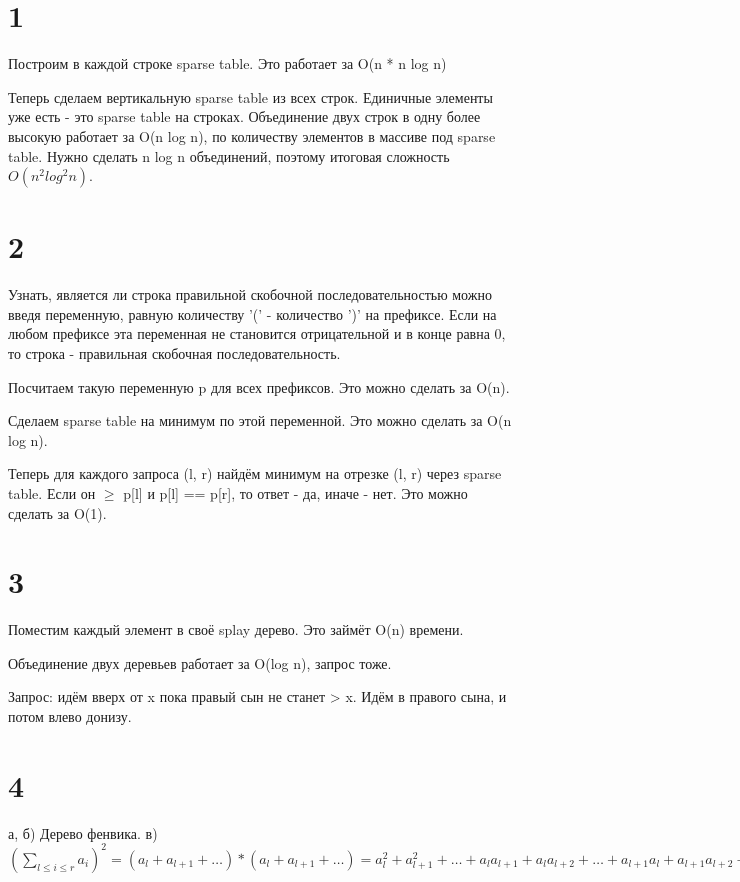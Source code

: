 \documentclass[12pt]{extarticle}
\begin{document}
\section*{1}
Построим в каждой строке sparse table. Это работает за O(n * n log n)

Теперь сделаем вертикальную sparse table из всех строк. Единичные элементы уже есть - это sparse table на строках. Объединение двух строк в одну более высокую работает за O(n log n), по количеству элементов в массиве под sparse table. Нужно сделать n log n объединений, поэтому итоговая сложность $O(n^2 log^2 n)$.

\section*{2}
Узнать, является ли строка правильной скобочной последовательностью можно введя переменную, равную количеству '(' - количество ')' на префиксе. Если на любом префиксе эта переменная не становится отрицательной и в конце равна 0, то строка - правильная скобочная последовательность.

Посчитаем такую переменную p для всех префиксов. Это можно сделать за O(n).

Сделаем sparse table на минимум по этой переменной. Это можно сделать за O(n log n).

Теперь для каждого запроса (l, r) найдём минимум на отрезке (l, r) через sparse table. Если он $\ge$ p[l] и p[l] == p[r], то ответ - да, иначе - нет. Это можно сделать за O(1).

\section*{3}
Поместим каждый элемент в своё splay дерево. Это займёт O(n) времени.

Объединение двух деревьев работает за O(log n), запрос тоже.

Запрос: идём вверх от x пока правый сын не станет > x. Идём в правого сына, и потом влево донизу.

\section*{4}

а, б) Дерево фенвика.
\newline
\newline
в) $(\sum\limits_{l \le i \le r} a_i) ^ 2 = (a_l + a_{l + 1} + \dots) * (a_l + a_{l + 1} + \dots) = a_l^2 + a_{l + 1}^2 + \dots + a_l a_{l + 1} + a_l a_{l + 2} + \dots + a_{l + 1} a_l + a_{l + 1} a_{l + 2} + \dots$ 
\end{document}
